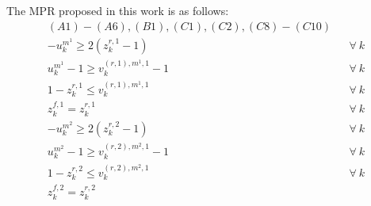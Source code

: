 \documentclass[]{interact}
\theoremstyle{plain}%
\theoremstyle{definition}
\theoremstyle{remark}
\begin{document}
The MPR proposed in this work is as follows: 
\begin{eqnarray}
(A1)-(A6),(B1),(C1),(C2),(C8)-(C10)\nonumber\\
- u^{m^1}_k \ge 2(z^{r,1}_{k}-1)&& \forall\ k\label{merge:s1.1}\\
u^{m^1}_k - 1 \ge v^{(r,1),m^1,1}_k-1 && \forall\ k \label{merge:s1.2}\\
1 - z^{r,1}_{k} \le v^{(r,1),m^1,1}_k&&\forall\ k\label{merge:s1.3}\\
z^{f,1}_{k} = z^{r,1}_{k}&&\forall\ k\label{merge:f1.1}\\
- u^{m^2}_k \ge 2(z^{r,2}_{k}-1)&& \forall\ k\label{merge:s2.1}\\
u^{m^2}_k - 1 \ge v^{(r,2),m^2,1}_k-1 && \forall\ k \label{merge:s2.2}\\
1 - z^{r,2}_{k} \le v^{(r,2),m^2,1}_k&&\forall\ k\label{merge:s2.3}\\
z^{f,2}_{k} = z^{r,2}_{k} &&\label{merge:f2.1}
\end{eqnarray}
\end{document}
